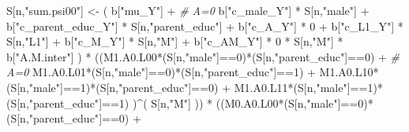 \documentclass[
]{book}
\newenvironment{Shaded}{\begin{snugshade}}{\end{snugshade}}
\newcommand{\CommentTok}[1]{\textcolor[rgb]{0.56,0.35,0.01}{\textit{#1}}}
\newcommand{\DecValTok}[1]{\textcolor[rgb]{0.00,0.00,0.81}{#1}}
\newcommand{\NormalTok}[1]{#1}
\newcommand{\OtherTok}[1]{\textcolor[rgb]{0.56,0.35,0.01}{#1}}
\newcommand{\SpecialCharTok}[1]{\textcolor[rgb]{0.00,0.00,0.00}{#1}}
\newcommand{\StringTok}[1]{\textcolor[rgb]{0.31,0.60,0.02}{#1}}
\begin{document}
\begin{Shaded}
\begin{Highlighting}[]
\NormalTok{    S[n,}\StringTok{"sum.psi00"}\NormalTok{] }\OtherTok{\textless{}{-}}\NormalTok{  ( b[}\StringTok{"mu\_Y"}\NormalTok{] }\SpecialCharTok{+}                                          \CommentTok{\# A=0}
\NormalTok{                             b[}\StringTok{"c\_male\_Y"}\NormalTok{] }\SpecialCharTok{*}\NormalTok{ S[n,}\StringTok{"male"}\NormalTok{] }\SpecialCharTok{+} 
\NormalTok{                             b[}\StringTok{"c\_parent\_educ\_Y"}\NormalTok{] }\SpecialCharTok{*}\NormalTok{ S[n,}\StringTok{"parent\_educ"}\NormalTok{] }\SpecialCharTok{+} 
\NormalTok{                             b[}\StringTok{"c\_A\_Y"}\NormalTok{] }\SpecialCharTok{*} \DecValTok{0} \SpecialCharTok{+} 
\NormalTok{                             b[}\StringTok{"c\_L1\_Y"}\NormalTok{] }\SpecialCharTok{*}\NormalTok{ S[n,}\StringTok{"L1"}\NormalTok{] }\SpecialCharTok{+}
\NormalTok{                             b[}\StringTok{"c\_M\_Y"}\NormalTok{] }\SpecialCharTok{*}\NormalTok{ S[n,}\StringTok{"M"}\NormalTok{] }\SpecialCharTok{+}
\NormalTok{                             b[}\StringTok{"c\_AM\_Y"}\NormalTok{] }\SpecialCharTok{*} \DecValTok{0} \SpecialCharTok{*}\NormalTok{ S[n,}\StringTok{"M"}\NormalTok{] }\SpecialCharTok{*}\NormalTok{ b[}\StringTok{"A.M.inter"}\NormalTok{] ) }\SpecialCharTok{*}
\NormalTok{      ((M1.A0.L00}\SpecialCharTok{*}\NormalTok{(S[n,}\StringTok{"male"}\NormalTok{]}\SpecialCharTok{==}\DecValTok{0}\NormalTok{)}\SpecialCharTok{*}\NormalTok{(S[n,}\StringTok{"parent\_educ"}\NormalTok{]}\SpecialCharTok{==}\DecValTok{0}\NormalTok{) }\SpecialCharTok{+}                    \CommentTok{\# A\textquotesingle{}=0}
\NormalTok{          M1.A0.L01}\SpecialCharTok{*}\NormalTok{(S[n,}\StringTok{"male"}\NormalTok{]}\SpecialCharTok{==}\DecValTok{0}\NormalTok{)}\SpecialCharTok{*}\NormalTok{(S[n,}\StringTok{"parent\_educ"}\NormalTok{]}\SpecialCharTok{==}\DecValTok{1}\NormalTok{) }\SpecialCharTok{+}
\NormalTok{          M1.A0.L10}\SpecialCharTok{*}\NormalTok{(S[n,}\StringTok{"male"}\NormalTok{]}\SpecialCharTok{==}\DecValTok{1}\NormalTok{)}\SpecialCharTok{*}\NormalTok{(S[n,}\StringTok{"parent\_educ"}\NormalTok{]}\SpecialCharTok{==}\DecValTok{0}\NormalTok{) }\SpecialCharTok{+} 
\NormalTok{          M1.A0.L11}\SpecialCharTok{*}\NormalTok{(S[n,}\StringTok{"male"}\NormalTok{]}\SpecialCharTok{==}\DecValTok{1}\NormalTok{)}\SpecialCharTok{*}\NormalTok{(S[n,}\StringTok{"parent\_educ"}\NormalTok{]}\SpecialCharTok{==}\DecValTok{1}\NormalTok{) )}\SpecialCharTok{\^{}}\NormalTok{( S[n,}\StringTok{"M"}\NormalTok{] )) }\SpecialCharTok{*}
\NormalTok{      ((M0.A0.L00}\SpecialCharTok{*}\NormalTok{(S[n,}\StringTok{"male"}\NormalTok{]}\SpecialCharTok{==}\DecValTok{0}\NormalTok{)}\SpecialCharTok{*}\NormalTok{(S[n,}\StringTok{"parent\_educ"}\NormalTok{]}\SpecialCharTok{==}\DecValTok{0}\NormalTok{) }\SpecialCharTok{+}                

\end{Highlighting}
\end{Shaded}
\end{document}
